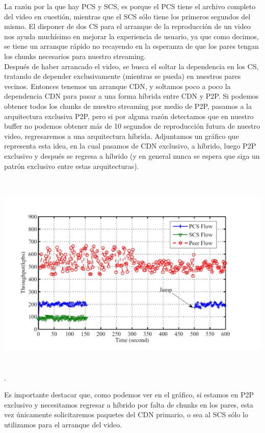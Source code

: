 \documentclass[12pt]{report}
\begin{document}
La razón por la que hay PCS y SCS, es porque el PCS tiene el archivo completo del video en cuestión, mientras que el SCS sólo tiene los primeros segundos del mismo. El disponer de dos CS para el arranque de la reproducción de un video nos ayuda muchísimo en mejorar la experiencia de usuario, ya que como decimos, se tiene un arranque rápido no recayendo en la esperanza de que los pares tengan los chunks necesarios para nuestro streaming.\\
Después de haber arrancado el video, se busca el soltar la dependencia en los CS, tratando de depender exclusivamente (mientras se pueda) en nuestros pares vecinos. Entonces tenemos un arranque CDN, y soltamos poco a poco la dependencia CDN para pasar a una forma híbrida entre CDN y P2P. Si podemos obtener todos los chunks de nuestro streaming por medio de P2P, pasamos a la arquitectura exclusiva P2P, pero si por alguna razón detectamos que en nuestro buffer no podemos obtener más de 10 segundos de reproducción futura de nuestro video, regresaremos a una arquitectura híbrida. Adjuntamos un gráfico que representa esta idea, en la cual pasamos de CDN exclusivo, a híbrido, luego P2P exclusivo y después se regresa a híbrido (y en general nunca se espera que siga un patrón exclusivo entre estas arquitecturas).

\includegraphics[height=10cm]{images/img2}.

Es importante destacar que, como podemos ver en el gráfico, si estamos en P2P exclusivo y necesitamos regresar a híbrido por falta de chunks en los pares, esta vez únicamente solicitaremos paquetes del CDN primario, o sea al SCS sólo lo utilizamos para el arranque del video.\\
\end{document}
